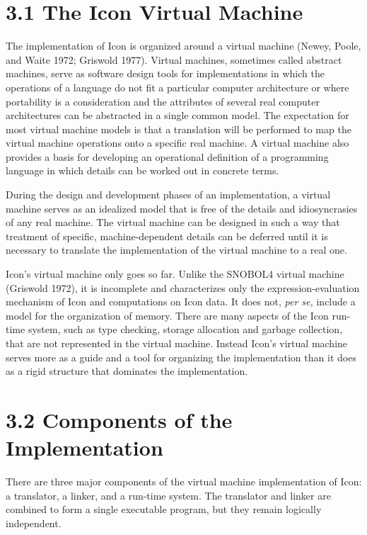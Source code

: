 \section[3.1 The Icon Virtual Machine]{3.1 The Icon Virtual Machine}

The implementation of Icon is organized around a virtual machine
(Newey, Poole, and Waite 1972; Griswold 1977). Virtual machines,
sometimes called abstract machines, serve as software design tools for
implementations in which the operations of a language do not fit a
particular computer architecture or where portability is a
consideration and the attributes of several real computer
architectures can be abstracted in a single common model. The
expectation for most virtual machine models is that a translation will
be performed to map the virtual machine operations onto a specific
real machine. A virtual machine also provides a basis for developing
an operational definition of a programming language in which details
can be worked out in concrete terms.

During the design and development phases of an implementation, a
virtual machine serves as an idealized model that is free of the
details and idiosyncrasies of any real machine. The virtual machine
can be designed in such a way that treatment of specific,
machine-dependent details can be deferred until it is necessary to
translate the implementation of the virtual machine to a real one.

Icon's virtual machine only goes so far. Unlike the SNOBOL4 virtual
machine (Griswold 1972), it is incomplete and characterizes only the
expression-evaluation mechanism of Icon and computations on Icon
data. It does not, \textit{per se, }include a model for the
organization of memory. There are many aspects of the Icon run-time
system, such as type checking, storage allocation and garbage
collection, that are not represented in the virtual machine. Instead
Icon's virtual machine serves more as a guide and a tool for
organizing the implementation than it does as a rigid structure that
dominates the implementation.


\section[3.2 Components of the Implementation]{3.2 \textbf{Components of the Implementation}}

There are three major components of the virtual machine implementation
of Icon: a translator, a linker, and a run-time system. The translator
and linker are combined to form a single executable program, but they
remain logically independent.

